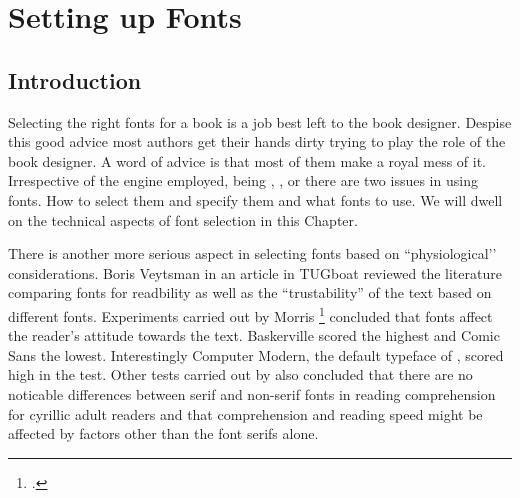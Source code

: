 \newfontfamily{}
\let\codetwothousandone\pan
\let\codetwothousand\pan
\newcommand{\mf}{{\fontencoding{U}\fontfamily{zmf}\selectfont METAFONT}}

\newcommand{\pcstrut}{\vrule height11pt width0pt}

\newcommand{\sample}{Typographia Ars Artium Omnium}%

\newcommand{\thefont}[4][OT1]{%
	\textcolor{thefontname}{#2}&%
	\pcstrut\fontencoding{#1}\fontfamily{#3}\selectfont#4\\}

\newcommand{\fonttitle}[1]{%
	\multicolumn2{p{\columnwidth}}{\vrule height1.5pc width0pt
	\fontseries{b}\selectfont\textcolor{black}{#1}}\\[3pt]}




\chapter{Setting up Fonts}
\label{ch:fonts}
\section{Introduction}
\pagestyle{headings}
Selecting the right fonts for a book is a job best left to the book designer. Despise this good advice most \latex authors get their hands dirty trying to play the role of the book designer. A word of advice is that most of them make a royal mess of it. Irrespective of the \tex engine employed, being \tex, \latexe, \lualatex or \xelatex there are two issues in using fonts. How to select them and specify them and what fonts to use. We will dwell on the technical aspects of font selection in this Chapter.

There is another more serious aspect in selecting fonts based on ``physiological’’ considerations. Boris Veytsman in an article in TUGboat \citep{boris2012} reviewed the literature comparing fonts for readbility as well as the ``trustability'' of the text based on different fonts. Experiments carried out by Morris \footcite{morris2012a} concluded that fonts affect the reader's attitude towards the text. Baskerville scored the highest and Comic Sans the lowest.
Interestingly Computer Modern, the default typeface of \tex, scored high in the test.  Other tests carried out by \cite{boris2012a} also concluded that there are no noticable differences between serif and non-serif fonts in reading comprehension for cyrillic adult readers and that comprehension and reading speed might be affected by factors other than the font serifs alone. 

